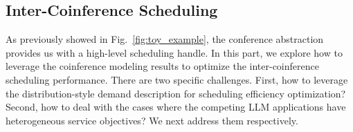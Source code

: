 



\subsection{Inter-Coinference Scheduling}
\label{subsec:inter-coinf scheduling}

As previously showed in Fig.~\ref{fig:toy_example}, the conference abstraction provides us with a high-level scheduling handle.
In this part, we explore how to leverage the coinference modeling results to optimize the inter-coinference scheduling performance.
There are two specific challenges. 
First, how to leverage the distribution-style demand description for scheduling efficiency optimization?
Second, how to deal with the cases where the competing LLM applications have heterogeneous service objectives?
We next address them respectively.


